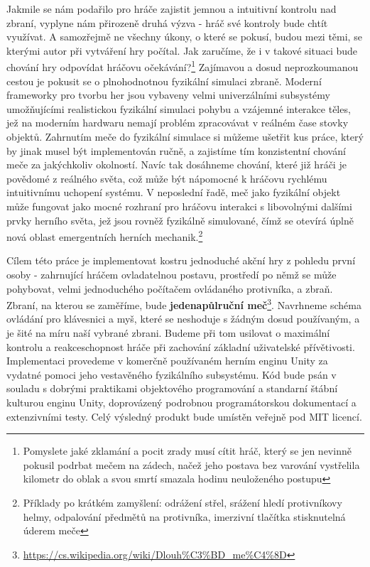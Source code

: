 Jakmile se nám podařilo pro hráče zajistit jemnou a intuitivní kontrolu nad zbraní, vyplyne nám přirozeně druhá výzva - hráč své kontroly bude chtít využívat. A samozřejmě ne všechny úkony, o které se pokusí, budou mezi těmi, se kterými autor při vytváření hry počítal. Jak zaručíme, že i v takové situaci bude chování hry odpovídat hráčovu očekávání?\footnote{Pomyslete jaké zklamání a pocit zrady musí cítit hráč, který se jen nevinně pokusil podrbat mečem na zádech, načež jeho postava bez varování vystřelila kilometr do oblak a svou smrtí smazala hodinu neuloženého postupu} Zajímavou a dosud neprozkoumanou cestou je pokusit se o plnohodnotnou fyzikální simulaci zbraně. Moderní frameworky pro tvorbu her jsou vybaveny velmi univerzálními subsystémy umožňujícími realistickou fyzikální simulaci pohybu a vzájemné interakce těles, jež na moderním hardwaru nemají problém zpracovávat v reálném čase stovky objektů. Zahrnutím meče do fyzikální simulace si můžeme ušetřit kus práce, který by jinak musel být implementován ručně, a zajistíme tím konzistentní chování meče za jakýchkoliv okolností. Navíc tak dosáhneme chování, které již hráči je povědomé z reálného světa, což může být nápomocné k hráčovu rychlému intuitivnímu uchopení systému. V neposlední řadě, meč jako fyzikální objekt může fungovat jako mocné rozhraní pro hráčovu interakci s libovolnými dalšími prvky herního světa, jež jsou rovněž fyzikálně simulované, čímž se otevírá úplně nová oblast emergentních herních mechanik.\footnote{Příklady po krátkém zamyšlení: odrážení střel, srážení hledí protivníkovy helmy, odpalování předmětů na protivníka, imerzivní tlačítka stisknutelná úderem meče}

Cílem této práce je implementovat kostru jednoduché akční hry z pohledu první osoby - zahrnující hráčem ovladatelnou postavu, prostředí po němž se může pohybovat, velmi jednoduchého počítačem ovládaného protivníka, a zbraň. Zbraní, na kterou se zaměříme, bude \textbf{jedenapůlruční meč}\footnote{\url{https://cs.wikipedia.org/wiki/Dlouh\%C3\%BD_me\%C4\%8D}}. Navrhneme schéma ovládání pro klávesnici a myš, které se neshoduje s žádným dosud používaným, a je šité na míru naší vybrané zbrani. Budeme při tom usilovat o maximální kontrolu a reakceschopnost hráče při zachování základní uživatelské přívětivosti. Implementaci provedeme v komerčně používaném herním enginu Unity za vydatné pomoci jeho vestavěného fyzikálního subsystému. Kód bude psán v souladu s dobrými praktikami objektového programování a standarní štábní kulturou enginu Unity, doprovázený podrobnou programátorskou dokumentací a extenzivními testy. Celý výsledný produkt bude umístěn veřejně pod MIT licencí.

